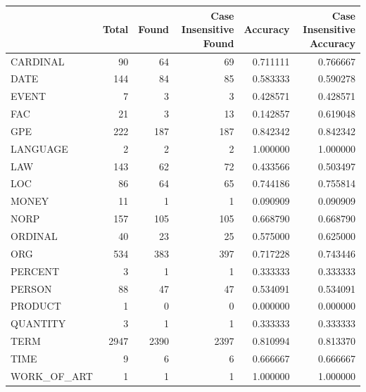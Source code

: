 \begin{tabular}{lrrrrr}
\toprule
 & Total & Found & Case Insensitive Found & Accuracy & Case Insensitive Accuracy \\
\midrule
CARDINAL & 90 & 64 & 69 & 0.711111 & 0.766667 \\
DATE & 144 & 84 & 85 & 0.583333 & 0.590278 \\
EVENT & 7 & 3 & 3 & 0.428571 & 0.428571 \\
FAC & 21 & 3 & 13 & 0.142857 & 0.619048 \\
GPE & 222 & 187 & 187 & 0.842342 & 0.842342 \\
LANGUAGE & 2 & 2 & 2 & 1.000000 & 1.000000 \\
LAW & 143 & 62 & 72 & 0.433566 & 0.503497 \\
LOC & 86 & 64 & 65 & 0.744186 & 0.755814 \\
MONEY & 11 & 1 & 1 & 0.090909 & 0.090909 \\
NORP & 157 & 105 & 105 & 0.668790 & 0.668790 \\
ORDINAL & 40 & 23 & 25 & 0.575000 & 0.625000 \\
ORG & 534 & 383 & 397 & 0.717228 & 0.743446 \\
PERCENT & 3 & 1 & 1 & 0.333333 & 0.333333 \\
PERSON & 88 & 47 & 47 & 0.534091 & 0.534091 \\
PRODUCT & 1 & 0 & 0 & 0.000000 & 0.000000 \\
QUANTITY & 3 & 1 & 1 & 0.333333 & 0.333333 \\
TERM & 2947 & 2390 & 2397 & 0.810994 & 0.813370 \\
TIME & 9 & 6 & 6 & 0.666667 & 0.666667 \\
WORK_OF_ART & 1 & 1 & 1 & 1.000000 & 1.000000 \\
\bottomrule
\end{tabular}
